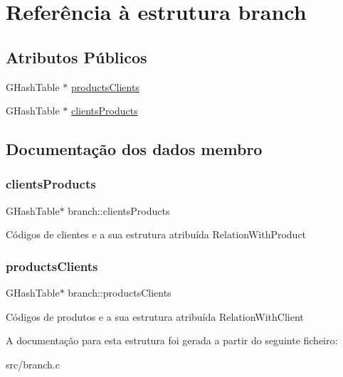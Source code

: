 \hypertarget{structbranch}{}\section{Referência à estrutura branch}
\label{structbranch}
\subsection*{Atributos Públicos}
\begin{DoxyCompactItemize}
\item 
G\+Hash\+Table $\ast$ \hyperlink{structbranch_a71471a47ea99d3c3c10c8378630d6a2f}{products\+Clients}
\item 
G\+Hash\+Table $\ast$ \hyperlink{structbranch_ab06808b3209d7e457ea2f46cdabec8c6}{clients\+Products}
\end{DoxyCompactItemize}


\subsection{Documentação dos dados membro}
\mbox{\label{structbranch_ab06808b3209d7e457ea2f46cdabec8c6}} 
\subsubsection{\texorpdfstring{clients\+Products}{clientsProducts}}
{\footnotesize\ttfamily G\+Hash\+Table$\ast$ branch\+::clients\+Products}

Códigos de clientes e a sua estrutura atribuída Relation\+With\+Product \mbox{\label{structbranch_a71471a47ea99d3c3c10c8378630d6a2f}} 
\subsubsection{\texorpdfstring{products\+Clients}{productsClients}}
{\footnotesize\ttfamily G\+Hash\+Table$\ast$ branch\+::products\+Clients}

Códigos de produtos e a sua estrutura atribuída Relation\+With\+Client 

A documentação para esta estrutura foi gerada a partir do seguinte ficheiro\+:\begin{DoxyCompactItemize}
\item 
src/branch.\+c\end{DoxyCompactItemize}
